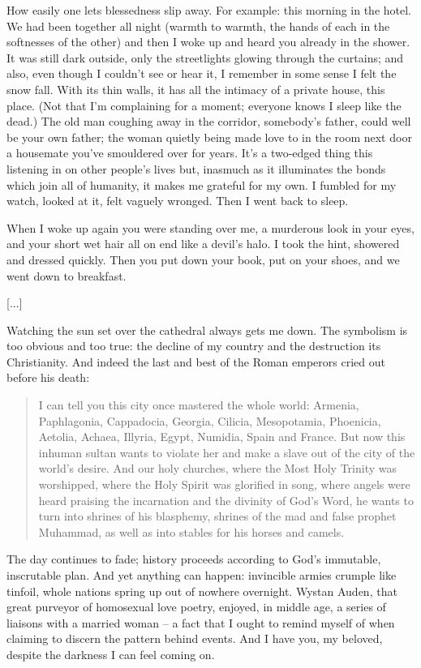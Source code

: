 How easily one lets blessedness slip away. For example: this morning in the hotel. We had been together all night (warmth to warmth, the hands of each in the softnesses of the other) and then I woke up and heard you already in the shower. It was still dark outside, only the streetlights glowing through the curtains; and also, even though I couldn't see or hear it, I remember in some sense I felt the snow fall. With its thin walls, it has all the intimacy of a private house, this place. (Not that I'm complaining for a moment; everyone knows I sleep like the dead.) The old man coughing away in the corridor, somebody's father, could well be your own father; the woman quietly being made love to in the room next door a housemate you've smouldered over for years. It's a two-edged thing this listening in on other people's lives but, inasmuch as it illuminates the bonds which join all of humanity, it makes me grateful for my own. I fumbled for my watch, looked at it, felt vaguely wronged. Then I went back to sleep.

When I woke up again you were standing over me, a murderous look in your eyes, and your short wet hair all on end like a devil's halo. I took the hint, showered and dressed quickly. Then you put down your book, put on your shoes, and we went down to breakfast.

[...]

Watching the sun set over the cathedral always gets me down. The symbolism is too obvious and too true: the decline of my country and the destruction its Christianity. And indeed the last and best of the Roman emperors cried out before his death:

\begin{quote}
    I can tell you this city once mastered the whole world: Armenia, Paphlagonia, Cappadocia, Georgia, Cilicia, Mesopotamia, Phoenicia, Aetolia, Achaea, Illyria, Egypt, Numidia, Spain and France. But now this inhuman sultan wants to violate her and make a slave out of the city of the world's desire. And our holy churches, where the Most Holy Trinity was worshipped, where the Holy Spirit was glorified in song, where angels were heard praising the incarnation and the divinity of God's Word, he wants to turn into shrines of his blasphemy, shrines of the mad and false prophet Muhammad, as well as into stables for his horses and camels.
\end{quote}

The day continues to fade; history proceeds according to God's immutable, inscrutable plan. And yet anything can happen: invincible armies crumple like tinfoil, whole nations spring up out of nowhere overnight. Wystan Auden, that great purveyor of homosexual love poetry, enjoyed, in middle age, a series of liaisons with a married woman -- a fact that I ought to remind myself of when claiming to discern the pattern behind events. And I have you, my beloved, despite the darkness I can feel coming on.
